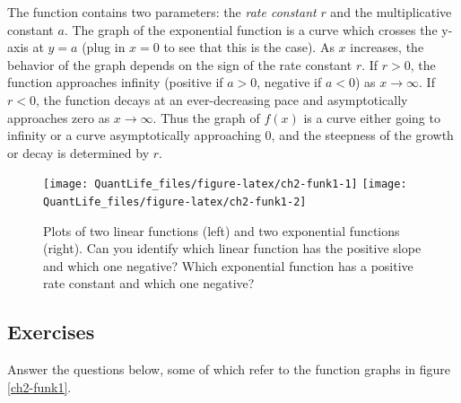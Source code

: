 \documentclass[
]{book}
\begin{document}
The function contains two parameters: the \emph{rate constant} \(r\) and the multiplicative constant \(a\). The graph of the exponential function is a curve which crosses the y-axis at \(y=a\) (plug in \(x=0\) to see that this is the case). As \(x\) increases, the behavior of the graph depends on the sign of the rate constant \(r\). If \(r>0\), the function approaches infinity (positive if \(a>0\), negative if \(a<0\)) as \(x \to \infty\). If \(r<0\), the function decays at an ever-decreasing pace and asymptotically approaches zero as \(x \to \infty\). Thus the graph of \(f(x)\) is a curve either going to infinity or a curve asymptotically approaching 0, and the steepness of the growth or decay is determined by \(r\).

\begin{figure}

{\centering \texttt{[image: QuantLife\_files/figure-latex/ch2-funk1-1]} \texttt{[image: QuantLife\_files/figure-latex/ch2-funk1-2]} 

}

\caption{Plots of two linear functions (left) and two exponential functions (right). Can you identify which linear function has the positive slope and which one negative? Which exponential function has a positive rate constant and which one negative?}\label{fig:ch2-funk1}
\end{figure}

\hypertarget{exercises-1}{%
\subsection{Exercises}\label{exercises-1}}

Answer the questions below, some of which refer to the function graphs in figure \ref{ch2-funk1}.
\end{document}

